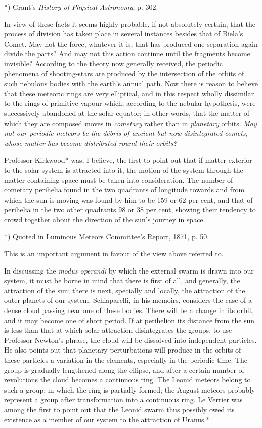 \documentclass[a4paper, 12pt, oneside, polutonikogreek, english]{article}
\begin{document}
*) Grant's \emph{History of Physical Astronomy}, p. 302.

In view of these facts it seems highly probable, if not absolutely certain, that the process of division has taken place in several instances besides that of Biela's Comet. May not the force, whatever it is, that has produced one separation again divide the parts? And may not this action continue until the fragments become invisible? According to the theory now generally received, the periodic phenomena of shooting-stars are produced by the intersection of the orbits of such nebulous bodies with the earth's annual path. Now there is reason to believe that these meteoric rings are very elliptical, and in this respect wholly dissimilar to the rings of primitive vapour which, according to the nebular hypothesis, were successively abandoned at the solar equator; in other words, that the matter of which they are composed moves in \emph{cometary} rather than in \emph{planetary} orbits. \emph{May not our periodic meteors be the débris of ancient but now disintegrated comets, whose matter has become distributed round their orbits?}

Professor Kirkwood* was, I believe, the first to point out that if matter exterior to the solar system is attracted into it, the motion of the system through the matter-containing space must be taken into consideration. The number of cometary perihelia found in the two quadrants of longitude towards and from which the sun is moving was found by him to be 159 or 62 per cent, and that of perihelia in the two other quadrants 98 or 38 per cent, showing their tendency to crowd together about the direction of the sun's journey in space.

*) Quoted in Luminous Meteors Committee's Report, 1871, p. 50.

This is an important argument in favour of the view above referred to.

In discussing the \emph{modus operandi} by which the external swarm is drawn into our system, it must be borne in mind that there is first of all, and generally, the attraction of the sun; there is next, specially and locally, the attraction of the outer planets of our system. Schiaparelli, in his memoirs, considers the case of a dense cloud passing near one of these bodies. There will be a change in its orbit, and it may become one of short period. If at perihelion its distance from the sun is less than that at which solar attraction disintegrates the groups, to use Professor Newton's phrase, the cloud will be dissolved into independent particles. He also points out that planetary perturbations will produce in the orbits of these particles a variation in the elements, especially in the periodic time. The group is gradually lengthened along the ellipse, and after a certain number of revolutions the cloud becomes a continuous ring. The Leonid meteors belong to such a group, in which the ring is partially formed; the August meteors probably represent a group after transformation into a continuous ring. Le Verrier was among the first to point out that the Leonid swarm thus possibly owed its existence as a member of our system to the attraction of Uranus.*
\end{document}

